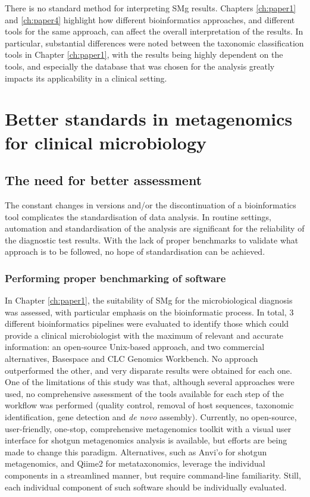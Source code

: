 There is no standard method for interpreting \ac{SMg} results. Chapters \ref{ch:paper1} and \ref{ch:paper4} highlight how different bioinformatics approaches, and different tools for the same approach, can affect the overall interpretation of the results. In particular, substantial differences were noted between the taxonomic classification tools in Chapter \ref{ch:paper1}, with the results being highly dependent on the tools, and especially the database that was chosen for the analysis greatly impacts its applicability in a clinical setting. 

\section{Better standards in metagenomics for clinical microbiology}

\subsection{The need for better assessment}

The constant changes in versions and/or the discontinuation of a bioinformatics tool complicates the standardisation of data analysis. In routine settings, automation and standardisation of the analysis are significant for the reliability of the diagnostic test results. With the lack of proper benchmarks to validate what approach is to be followed, no hope of standardisation can be achieved.


\subsubsection{Performing proper benchmarking of software}

In Chapter \ref{ch:paper1}, the suitability of \ac{SMg} for the microbiological diagnosis was assessed, with particular emphasis on the bioinformatic process. In total, 3 different bioinformatics pipelines were evaluated to identify those which could provide a clinical microbiologist with the maximum of relevant and accurate information: an open-source Unix-based approach, and two commercial alternatives, Basespace and CLC Genomics Workbench. No approach outperformed the other, and very disparate results were obtained for each one. One of the limitations of this study was that, although several approaches were used, no comprehensive assessment of the tools available for each step of the workflow was performed (quality control, removal of host sequences, taxonomic identification, gene detection and \textit{de novo} assembly). Currently, no open-source, user-friendly, one-stop, comprehensive metagenomics toolkit with a visual user interface for shotgun metagenomics analysis is available, but efforts are being made to change this paradigm. Alternatives, such as Anvi'o \citep{eren_anvio_2015} for shotgun metagenomics, and Qiime2 \citep{bolyen_reproducible_2019} for metataxonomics, leverage the individual components in a streamlined manner, but require command-line familiarity. Still, each individual component of such software should be individually evaluated.

